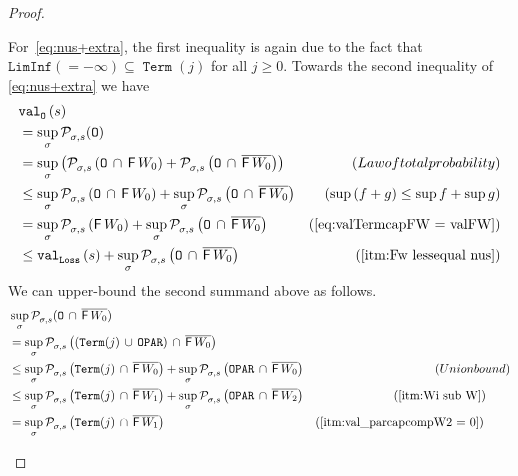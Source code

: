 \documentclass[a4paper,UKenglish,cleveref,autoref,thm-restate]{lipics-v2021}
\DeclareMathOperator{\Term}{\mathtt{Term}}
\DeclareMathOperator{\Loss}{\mathtt{Loss}}
\newcommand{\Oparity}{\mathtt{OPAR}}
\newcommand{\LimInf}[2]{\mathtt{LimInf}(#1 #2)}
\newcommand{\+}[1]{\mathbb{#1}}
\newcommand{\?}[1]{\mathcal{#1}}
\newcommand{\Prob}[2][]{\mathcal{P}^{#1}_{#2}}
\newcommand{\eventually}{{\sf F}}
\newcommand{\obj}{\mathtt{O}}
\newcommand{\lrc}[1]{\left(#1\right)}
\newcommand{\s}{s}
\newcommand{\complementof}[1]{\overline{#1}}
\newcommand{\zstrat}{\sigma}
\begin{document}
\begin{proof}
\begin{enumerate}
  For~\cref{eq:nus+extra}, the first inequality is again due to the fact
  that $\LimInf{=}{-\infty}\subseteq \Term(j)$ for all $j \ge 0$.
  Towards the second inequality of \cref{eq:nus+extra} we have
  \begin{align*}
    & \valueof[][\obj]{\s} \\
    & = \sup_{\zstrat}\Prob[]{\zstrat,\s}(\obj)\\ 
    & = \sup_{\zstrat}\left(\Prob{\zstrat,\s}\left(\obj\, \cap\, \eventually\, {W_0}\right) + \Prob{\zstrat,\s}\left(\obj\, \cap\,
      \complementof{\eventually\, {W_0}}\right)  \right)        & \lrc{\textrm{Law of total probability}} \nonumber \\
    & \le \sup_{\zstrat}\Prob{\zstrat,\s}\left(\obj\, \cap\, \eventually\, {W_0}\right) + \sup_{\zstrat}\Prob{\zstrat,\s}\left(\obj\, \cap\, \complementof{\eventually\, {W_0}}\right) & \lrc{\sup\lrc{f+g} \le \sup f + \sup g} \nonumber \\
    & = \sup_{\zstrat}\Prob{\zstrat,\s}\left(\eventually\, {W_0}\right)+\sup_{\zstrat}\Prob{\zstrat,\s} \left(\obj\, \cap\,
      \complementof{\eventually\, {W_0}}\right)                                  & \lrc{\cref{eq:valTermcapFW = valFW}} \nonumber          \\
    & \le \valueof[][\Loss]{\s}  + \sup_{\zstrat}\Prob{\zstrat,\s}
      \left(\obj\, \cap\, \complementof{\eventually\, {W_0}}\right)
    & \lrc{\cref{itm:Fw lessequal nus}}
  \end{align*}
  We can upper-bound the second summand above as follows.
  \begin{align*}
    & \sup_{\zstrat}\Prob{\zstrat,\s} (\obj\, \cap\,  \complementof{\eventually\, {W_0}}) \\
    & = \sup_{\zstrat}\Prob{\zstrat,\s} \left((\Term(j) \, \cup \, \Oparity)\, \cap\, \complementof{\eventually\, {W_0}}\right)\\
    & \le \sup_{\zstrat}\Prob{\zstrat,\s} \left(\Term(j)\, \cap\,
      \complementof{\eventually\, {W_0}}\right) +
      \sup_{\zstrat}\Prob{\zstrat,\s} \left(\Oparity\, \cap\,
      \complementof{\eventually\, {W_0}}\right)    & \lrc{\textrm{Union bound}} \nonumber   \\
    & \le \sup_{\zstrat}\Prob{\zstrat,\s} \left(\Term(j)\, \cap\, \complementof{\eventually\, {W_1}}\right) + \sup_{\zstrat}\Prob{\zstrat,\s} \left(\Oparity\, \cap\, \complementof{\eventually\, {W_2}}\right) & \lrc{\cref{itm:Wi sub W}}\quad\quad \nonumber                         \\
    & = \sup_{\zstrat}\Prob{\zstrat,\s} \left(\Term(j)\, \cap\, \complementof{\eventually\, {W_1}}\right) & \lrc{\cref{itm:val_parcapcompW2 = 0}}\quad\quad\qedhere
  \end{align*}
\end{enumerate}
\end{proof}
\end{document}
